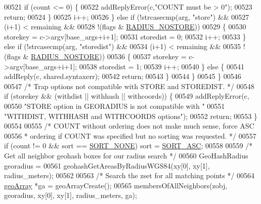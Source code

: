 \begin{DoxyCode}
{{{{{{{{{00521                 \textcolor{keywordflow}{if} (count <= 0) \{
00522                     addReplyError(c,\textcolor{stringliteral}{"COUNT must be > 0"});
00523                     \textcolor{keywordflow}{return};
00524                 \}
00525                 i++;
00526             \} \textcolor{keywordflow}{else} \textcolor{keywordflow}{if} (!strcasecmp(arg, \textcolor{stringliteral}{"store"}) &&
00527                        (i+1) < remaining &&
00528                        !(flags & \hyperlink{geo_8c_a0207f8145c258dfb559a8c0a1c960a2c}{RADIUS\_NOSTORE}))
00529             \{
00530                 storekey = c->argv[base\_args+i+1];
00531                 storedist = 0;
00532                 i++;
00533             \} \textcolor{keywordflow}{else} \textcolor{keywordflow}{if} (!strcasecmp(arg, \textcolor{stringliteral}{"storedist"}) &&
00534                        (i+1) < remaining &&
00535                        !(flags & \hyperlink{geo_8c_a0207f8145c258dfb559a8c0a1c960a2c}{RADIUS\_NOSTORE}))
00536             \{
00537                 storekey = c->argv[base\_args+i+1];
00538                 storedist = 1;
00539                 i++;
00540             \} \textcolor{keywordflow}{else} \{
00541                 addReply(c, shared.syntaxerr);
00542                 \textcolor{keywordflow}{return};
00543             \}
00544         \}
00545     \}
00546 
00547     \textcolor{comment}{/* Trap options not compatible with STORE and STOREDIST. */}
00548     \textcolor{keywordflow}{if} (storekey && (withdist || withhash || withcoords)) \{
00549         addReplyError(c,
00550             \textcolor{stringliteral}{"STORE option in GEORADIUS is not compatible with "}
00551             \textcolor{stringliteral}{"WITHDIST, WITHHASH and WITHCOORDS options"});
00552         \textcolor{keywordflow}{return};
00553     \}
00554 
00555     \textcolor{comment}{/* COUNT without ordering does not make much sense, force ASC}
00556 \textcolor{comment}{     * ordering if COUNT was specified but no sorting was requested. */}
00557     \textcolor{keywordflow}{if} (count != 0 && sort == \hyperlink{geo_8c_ac14be771411e01611e9e539c87567be4}{SORT\_NONE}) sort = \hyperlink{geo_8c_a4cc2ef7982bc374e2ba1832ace8338b7}{SORT\_ASC};
00558 
00559     \textcolor{comment}{/* Get all neighbor geohash boxes for our radius search */}
00560     GeoHashRadius georadius =
00561         geohashGetAreasByRadiusWGS84(xy[0], xy[1], radius\_meters);
00562 
00563     \textcolor{comment}{/* Search the zset for all matching points */}
00564     \hyperlink{structgeoArray}{geoArray} *ga = geoArrayCreate();
00565     membersOfAllNeighbors(zobj, georadius, xy[0], xy[1], radius\_meters, ga);
}}}}}}}}}
\end{DoxyCode}
